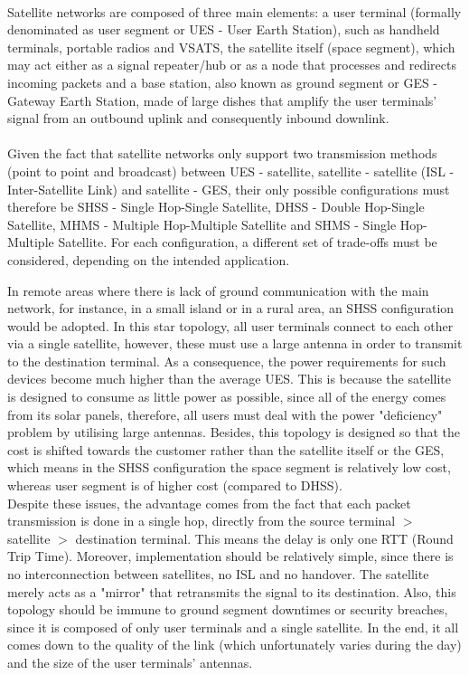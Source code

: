 \paragraph{}
Satellite networks are composed of three main elements: a user terminal (formally denominated as user segment or UES - User Earth Station), such as handheld terminals, portable radios and VSATS, the satellite itself (space segment), which may act either as a signal repeater/hub or as a node\autocite{book1_pp86} that processes and redirects incoming packets and a base station, also known as ground segment or GES - Gateway Earth Station, made of large dishes that amplify the user terminals' signal from an outbound uplink and consequently inbound downlink.

\paragraph{}
Given the fact that satellite networks only support two transmission methods (point to point and broadcast)\autocite{book1_pp28} between UES - satellite, satellite -  satellite (ISL - Inter-Satellite Link) and satellite - GES, their only possible configurations must therefore be SHSS - Single Hop-Single Satellite, DHSS - Double Hop-Single Satellite, MHMS - Multiple Hop-Multiple Satellite and SHMS - Single Hop-Multiple Satellite. For each configuration, a different set of trade-offs must be considered, depending on the intended application.

In remote areas where there is lack of ground communication with the main network, for instance, in a small island or in a rural area, an SHSS configuration would be adopted. In this star topology, all user terminals connect to each other via a single satellite, however, these must use a large antenna in order to transmit to the destination terminal. As a consequence, the power requirements for such devices become much higher than the average UES. This is because the satellite is designed to consume as little power as possible, since all of the energy comes from its solar panels, therefore, all users must deal with the power "deficiency" problem by utilising large antennas. Besides, this topology is designed so that the cost is shifted towards the customer rather than the satellite itself or the GES, which means in the SHSS configuration the space segment is relatively low cost, whereas user segment is of higher cost (compared to DHSS).\\
Despite these issues, the advantage comes from the fact that each packet transmission is done in a single hop, directly from the source terminal $>$ satellite $>$ destination terminal. This means the delay is only one RTT (Round Trip Time). Moreover, implementation should be relatively simple, since there is no interconnection between satellites, no ISL and no handover. The satellite merely acts as a "mirror" that retransmits the signal to its destination. Also, this topology should be immune to ground segment downtimes or security breaches, since it is composed of only user terminals and a single satellite. In the end, it all comes down to the quality of the link (which unfortunately varies during the day) and the size of the user terminals' antennas.\\

